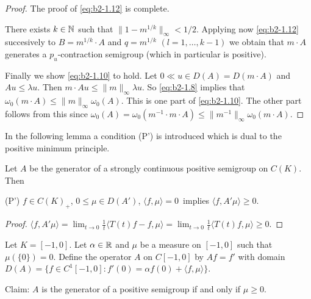 \begin{proof}
The proof of \eqref{eq:b2-1.12} is complete.

There exists $k \in \mathbb{N}$ such that $\|1 - m^{1/k}\|_{\infty} < 1/2$.
Applying now \eqref{eq:b2-1.12} 
succesively to $B = m^{1/k} \cdot A$ and $q = m^{1/k}$ $(l = 1, \ldots, k-1)$ we obtain that $m \cdot A$ generates a $p_{u}$-contraction semigroup (which in particular is positive).

Finally we show \eqref{eq:b2-1.10} 
to hold.
Let $0 \ll u \in D(A) = D(m \cdot A)$ and $Au \leq \lambda u$.
Then $m \cdot Au \leq \|m\|_{\infty}\lambda u$.
So \eqref{eq:b2-1.8} 
implies that $\omega_{0}(m \cdot A) \leq \|m\|_{\infty}\omega_{0}(A)$.
This is one part of \eqref{eq:b2-1.10}. 
The other part follows from this since $\omega_{0}(A) = \omega_{0}(m^{-1} \cdot m \cdot A) \leq \|m^{-1}\|_{\infty} \omega_{0}(m \cdot A)$.
\end{proof}

In the following lemma a condition (P') is introduced which is dual to the positive minimum principle.

\begin{lemma}\label{lem:b2-1.21}
Let $A$ be the generator of a strongly continuous positive semigroup on $C(K)$.
Then 

(P') \quad $f \in C(K)_{+}$,  $0 \leq \mu \in D(A')$,  $\langle f,\mu \rangle = 0$\, implies  $\langle f,A'\mu \rangle \geq 0$.
\end{lemma}

\begin{proof}
$\langle f,A'\mu \rangle = \lim_{t \to 0} \frac{1}{t} \langle T(t)f - f, \mu \rangle = \lim_{t \to 0} \frac{1}{t} \langle T(t)f, \mu \rangle \geq 0$.
\end{proof}

\begin{example}\label{ex:b2-1.22}
Let $K = [-1,0]$.
Let $\alpha \in \mathbb{R}$ and $\mu$ be a measure on $[-1,0]$ such that $\mu(\{0\}) = 0$.
Define the operator $A$ on $C[-1,0]$ by $Af = f'$ with domain $D(A) = \{f \in C^{1}[-1,0] \colon f'(0) = \alpha f(0) + \langle f,\mu \rangle\}$.

Claim: $A$ is the generator of a positive semigroup if and only if $\mu \geq 0$.
\end{example}

